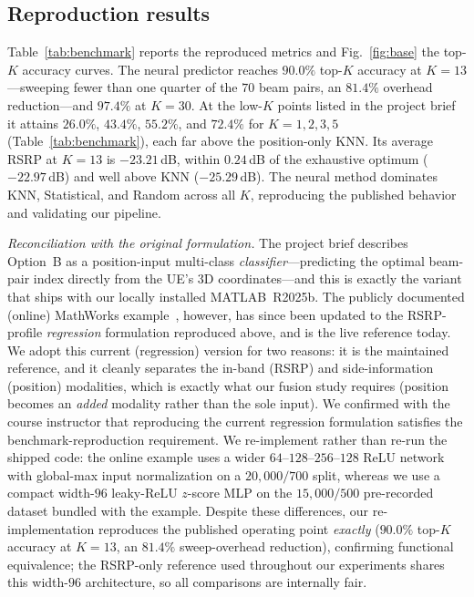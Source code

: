 \documentclass[conference]{IEEEtran}
\begin{document}
\subsection{Reproduction results}
Table~\ref{tab:benchmark} reports the reproduced metrics and Fig.~\ref{fig:base}
the top-$K$ accuracy curves. The neural predictor reaches $90.0\%$ top-$K$
accuracy at $K=13$---sweeping fewer than one quarter of the $70$ beam pairs, an
$81.4\%$ overhead reduction---and $97.4\%$ at $K=30$. At the low-$K$ points listed
in the project brief it attains $26.0\%$, $43.4\%$, $55.2\%$, and $72.4\%$ for
$K=1,2,3,5$ (Table~\ref{tab:benchmark}), each far above the position-only KNN.
Its average RSRP at $K=13$ is $-23.21$\,dB, within $0.24$\,dB of the exhaustive
optimum ($-22.97$\,dB) and well above KNN ($-25.29$\,dB). The neural method dominates KNN, Statistical, and
Random across all $K$, reproducing the published behavior and validating our
pipeline.

\emph{Reconciliation with the original formulation.} The project brief describes
Option~B as a position-input multi-class \emph{classifier}---predicting the
optimal beam-pair index directly from the UE's 3D coordinates---and this is
exactly the variant that ships with our locally installed MATLAB~R2025b. The
publicly documented (online) MathWorks example~\cite{mathworks2025beamselect},
however, has since been updated to the RSRP-profile \emph{regression} formulation
reproduced above, and is the live reference today. We adopt this current (regression) version for two reasons: it is
the maintained reference, and it cleanly separates the in-band (RSRP) and
side-information (position) modalities, which is exactly what our fusion study
requires (position becomes an \emph{added} modality rather than the sole input).
We confirmed with the course instructor that reproducing the current regression
formulation satisfies the benchmark-reproduction requirement. We re-implement
rather than re-run the shipped code: the online example uses a wider
$64$--$128$--$256$--$128$ ReLU network with global-max input normalization on a
$20{,}000/700$ split, whereas we use a compact width-$96$ leaky-ReLU $z$-score MLP
on the $15{,}000/500$ pre-recorded dataset bundled with the example. Despite these
differences, our re-implementation reproduces the published operating point
\emph{exactly} ($90.0\%$ top-$K$ accuracy at $K=13$, an $81.4\%$ sweep-overhead
reduction), confirming functional equivalence; the RSRP-only reference used
throughout our experiments shares this width-$96$ architecture, so all comparisons
are internally fair.
\end{document}
